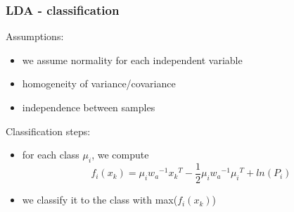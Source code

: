 \begin{frame}
  \frametitle{LDA - classification}
  
  Assumptions:
  \begin{itemize}
  	\item we assume normality for each independent variable
  	\item homogeneity of variance/covariance
  	\item independence between samples
  \end{itemize}

	Classification steps:
	\begin{itemize}
		\item for each class $\mu_i$, we compute 	
		\begin{equation}
		f_i(x_k) = \mu_i {w_a}^{-1} {x_k}^T - \dfrac{1}{2} \mu_i {w_a}^{-1} {\mu_i}^T + ln(P_i)
		\end{equation} 
		\item we classify it to the class with max($f_i(x_k)$)
	\end{itemize}
\end{frame}
%  
%    
%
%
%  
